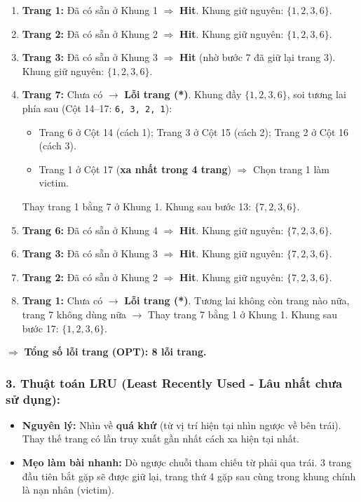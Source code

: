 \documentclass[11pt,a4paper]{article}
\begin{document}
\begin{enumerate}[label=\textbf{Cột \arabic*:}, leftmargin=*, itemsep=2pt]
    \item \textbf{Trang 1:} Đã có sẵn ở Khung 1 $\Rightarrow$ \textbf{Hit}. Khung giữ nguyên: $\{1, 2, 3, 6\}$.
    \item \textbf{Trang 2:} Đã có sẵn ở Khung 2 $\Rightarrow$ \textbf{Hit}. Khung giữ nguyên: $\{1, 2, 3, 6\}$.
    \item \textbf{Trang 3:} Đã có sẵn ở Khung 3 $\Rightarrow$ \textbf{Hit} (nhờ bước 7 đã giữ lại trang 3). Khung giữ nguyên: $\{1, 2, 3, 6\}$.
    \item \textbf{Trang 7:} Chưa có $\rightarrow$ \textbf{Lỗi trang (*)}. Khung đầy $\{1, 2, 3, 6\}$, soi tương lai phía sau (Cột 14--17: \texttt{6, 3, 2, 1}):
    \begin{itemize}[noitemsep]
        \item Trang 6 ở Cột 14 (cách 1); Trang 3 ở Cột 15 (cách 2); Trang 2 ở Cột 16 (cách 3).
        \item Trang 1 ở Cột 17 (\textbf{xa nhất trong 4 trang}) $\Rightarrow$ Chọn trang 1 làm victim.
    \end{itemize}
    Thay trang 1 bằng 7 ở Khung 1. Khung sau bước 13: $\{7, 2, 3, 6\}$.
    \item \textbf{Trang 6:} Đã có sẵn ở Khung 4 $\Rightarrow$ \textbf{Hit}. Khung giữ nguyên: $\{7, 2, 3, 6\}$.
    \item \textbf{Trang 3:} Đã có sẵn ở Khung 3 $\Rightarrow$ \textbf{Hit}. Khung giữ nguyên: $\{7, 2, 3, 6\}$.
    \item \textbf{Trang 2:} Đã có sẵn ở Khung 2 $\Rightarrow$ \textbf{Hit}. Khung giữ nguyên: $\{7, 2, 3, 6\}$.
    \item \textbf{Trang 1:} Chưa có $\rightarrow$ \textbf{Lỗi trang (*)}. Tương lai không còn trang nào nữa, trang 7 không dùng nữa $\rightarrow$ Thay trang 7 bằng 1 ở Khung 1. Khung sau bước 17: $\{1, 2, 3, 6\}$.
\end{enumerate}
$\Rightarrow$ \textbf{Tổng số lỗi trang (OPT): 8 lỗi trang.}

\subsubsection*{3. Thuật toán LRU (Least Recently Used - Lâu nhất chưa sử dụng):}
\begin{itemize}[noitemsep]
    \item \textbf{Nguyên lý:} Nhìn về \textbf{quá khứ} (từ vị trí hiện tại nhìn ngược về bên trái). Thay thế trang có lần truy xuất gần nhất cách xa hiện tại nhất.
    \item \textbf{Mẹo làm bài nhanh:} Dò ngược chuỗi tham chiếu từ phải qua trái. 3 trang đầu tiên bắt gặp sẽ được giữ lại, trang thứ 4 gặp sau cùng trong khung chính là nạn nhân (victim).
\end{itemize}
\end{document}
